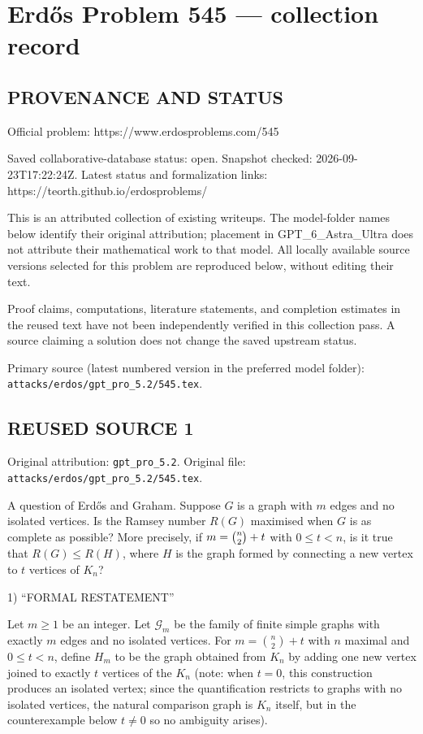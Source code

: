 \section*{Erd\H{o}s Problem 545 --- collection record}

\subsection*{PROVENANCE AND STATUS}
Official problem: https://www.erdosproblems.com/545

Saved collaborative-database status: open.
Snapshot checked: 2026-09-23T17:22:24Z.
Latest status and formalization links: https://teorth.github.io/erdosproblems/

This is an attributed collection of existing writeups. The model-folder names below identify their original attribution; placement in GPT\_6\_Astra\_Ultra does not attribute their mathematical work to that model. All locally available source versions selected for this problem are reproduced below, without editing their text.

Proof claims, computations, literature statements, and completion estimates in the reused text have not been independently verified in this collection pass. A source claiming a solution does not change the saved upstream status.

Primary source (latest numbered version in the preferred model folder): \texttt{attacks/erdos/gpt\_pro\_5.2/545.tex}.

\subsection*{REUSED SOURCE 1}
Original attribution: \texttt{gpt\_pro\_5.2}.
Original file: \texttt{attacks/erdos/gpt\_pro\_5.2/545.tex}.



A question of Erd\H{o}s and Graham. Suppose $G$ is a graph with $m$ edges and no isolated vertices. Is the Ramsey number $R(G)$ maximised when $G$ is as complete as possible? More precisely, if $m=\tbinom{n}{2}+t$ with $0\leq t<n$, is it true that $R(G)\leq R(H)$, where $H$ is the graph formed by connecting a new vertex to $t$ vertices of $K_n$? 

1) “FORMAL RESTATEMENT”

Let $m\ge 1$ be an integer. Let $\mathcal{G}_m$ be the family of finite simple graphs with exactly $m$ edges and no isolated vertices. For $m=\binom{n}{2}+t$ with $n$ maximal and $0\le t < n$, define $H_m$ to be the graph obtained from $K_n$ by adding one new vertex joined to exactly $t$ vertices of the $K_n$ (note: when $t=0$, this construction produces an isolated vertex; since the quantification restricts to graphs with no isolated vertices, the natural comparison graph is $K_n$ itself, but in the counterexample below $t\neq 0$ so no ambiguity arises).

